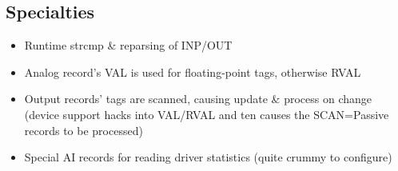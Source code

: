 \documentclass[letterpaper,landscape]{article}
\begin{document}
\begin{slide}
\section{Specialties}
\begin{itemize}
\item Runtime strcmp \& reparsing of INP/OUT
\item Analog record's VAL is used for floating-point tags, otherwise RVAL
\item Output records' tags are scanned, causing update \& process on
  change (device support hacks into VAL/RVAL and ten causes the
  SCAN=Passive records to be processed)
\item Special AI records for reading driver statistics
  (quite crummy to configure)
\end{itemize}
\vfill
~~
\end{slide}
\end{document}
